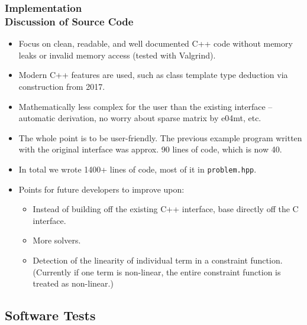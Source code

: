 \documentclass[ucs,10pt]{beamer}
\begin{document}
\begin{frame}
\frametitle{Implementation \\
\small \color{rwth-blue} Discussion of Source Code}
\begin{itemize}
	\item Focus on clean, readable, and well documented C++ code without memory leaks or invalid memory access (tested with Valgrind).
	\item Modern C++ features are used, such as class template type deduction via construction from 2017.
	\item Mathematically less complex for the user than the existing interface – automatic derivation, no worry about sparse matrix by e04mt, etc. 
	\item The whole point is to be user-friendly. The previous example program written with the original interface was approx. 90 lines of code, which is now 40.
	\item In total we wrote 1400+ lines of code, most of it in \texttt{problem.hpp}.
	\item Points for future developers to improve upon:
	\begin{itemize}
		\item Instead of building off the existing C++ interface, base directly off the C interface.
		\item More solvers.
		\item Detection of the linearity of individual term in a constraint function. (Currently if one term is non-linear, the entire constraint function is treated as non-linear.)
	\end{itemize}
\end{itemize}
\end{frame}


\subsection{Software Tests}
\end{document}
